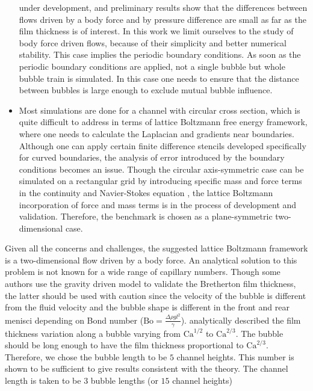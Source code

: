 \documentclass[preprint,12pt]{elsarticle}
\newcommand{\Ca}{\mathrm{Ca}}
\begin{document}
\begin{itemize}
under development, and preliminary results show that the differences between flows driven by a body
force and by
pressure difference are small as far as the film
 thickness is of interest.  In this work we limit ourselves to the study
of body force driven flows, because of their simplicity and better numerical stability. This
case implies the periodic boundary conditions. As soon as the periodic boundary
conditions are applied, not a single bubble but whole bubble train is simulated. In this case one
needs
to ensure that the distance between bubbles is large enough to exclude mutual bubble influence.
 \item Most simulations are done for a channel with circular cross section,
which is quite difficult to address in terms of lattice Boltzmann free energy
framework, where one needs to calculate the Laplacian and gradients near boundaries.
Although one can apply certain finite difference stencils
\cite{arnold-boundary,hunt-boundary} developed specifically for curved boundaries,
the analysis of error introduced by the boundary conditions becomes an issue. Though the circular
axis-symmetric case can be simulated on a rectangular grid by introducing specific mass and force
terms in the continuity and Navier-Stokes equation \cite{halliday-circular}, the lattice Boltzmann
incorporation of force and mass terms is in the process of development and validation. Therefore,
the benchmark is chosen as a plane-symmetric two-dimensional case.  

\end{itemize}
Given all the concerns and challenges, the suggested lattice Boltzmann framework
is a two-dimensional flow driven by a body force.  An analytical
solution to this problem is not known for a wide range of capillary
numbers.
Though some authors \cite{sehgal-microchannel} use the gravity driven model to
validate the Bretherton film thickness, the latter should be used with caution
since the velocity of the bubble is different from the fluid velocity and the
bubble shape
is different in the front and rear menisci depending on Bond number ($\mathrm{Bo}=\frac{\Delta \rho g
l^2}{\gamma}$). \citet{wong-films}
analytically described the film thickness variation along a bubble varying from $\Ca^{1/2}$ to
$\Ca^{2/3}$. The bubble should be long enough to have the film thickness proportional to
$\Ca^{2/3}$. Therefore, we chose the bubble length to be $5$ channel heights. This number is shown
to be sufficient to give results consistent with the theory. The
channel length is taken to be $3$ bubble lengths (or $15$ channel heights)
\end{document}

